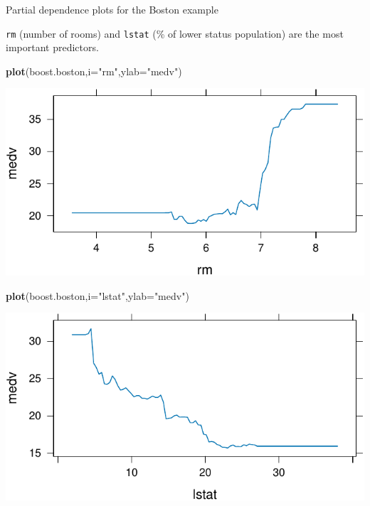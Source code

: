 \documentclass[
  10pt,
  ignorenonframetext,
]{beamer}
\newenvironment{Shaded}{\begin{snugshade}}{\end{snugshade}}
\newcommand{\AttributeTok}[1]{\textcolor[rgb]{0.13,0.29,0.53}{#1}}
\newcommand{\FunctionTok}[1]{\textcolor[rgb]{0.13,0.29,0.53}{\textbf{#1}}}
\newcommand{\NormalTok}[1]{#1}
\newcommand{\StringTok}[1]{\textcolor[rgb]{0.31,0.60,0.02}{#1}}
\begin{document}
\begin{frame}[fragile]
\begin{block}{Partial dependence plots for the Boston example}
\protect\hypertarget{partial-dependence-plots-for-the-boston-example}{}
\(~\)

\texttt{rm} (number of rooms) and \texttt{lstat} (\% of lower status
population) are the most important predictors.

\vspace{2mm}

\scriptsize

\begin{Shaded}
\begin{Highlighting}[]
\FunctionTok{plot}\NormalTok{(boost.boston,}\AttributeTok{i=}\StringTok{"rm"}\NormalTok{,}\AttributeTok{ylab=}\StringTok{"medv"}\NormalTok{)}
\end{Highlighting}
\end{Shaded}

\begin{center}\includegraphics[width=0.4\linewidth]{9TreeBost_files/figure-beamer/boston7-1} \end{center}

\begin{Shaded}
\begin{Highlighting}[]
\FunctionTok{plot}\NormalTok{(boost.boston,}\AttributeTok{i=}\StringTok{"lstat"}\NormalTok{,}\AttributeTok{ylab=}\StringTok{"medv"}\NormalTok{)}
\end{Highlighting}
\end{Shaded}

\begin{center}\includegraphics[width=0.4\linewidth]{9TreeBost_files/figure-beamer/boston7-2} \end{center}
\end{block}
\end{frame}
\end{document}
